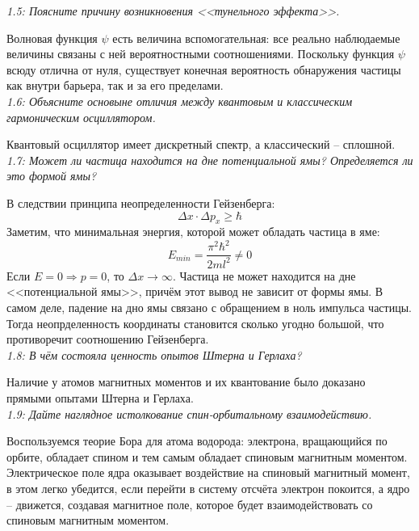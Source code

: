     \emph{1.5: Поясните причину возникновения <<тунельного эффекта>>.}

        Волновая функция \( \psi \) есть величина вспомогательная: 
        все реально наблюдаемые величины связаны с ней вероятностными
        соотношениями. Поскольку функция \( \psi \) всюду отлична от нуля, 
        существует конечная вероятность обнаружения частицы как внутри 
        барьера, так и за его пределами. \\

    \emph{1.6: Объясните основыне отличия между квантовым и классическим 
        гармоническим осциллятором.}
        
        Квантовый осциллятор имеет дискретный спектр, а классический -- 
        сплошной. \\

    \emph{1.7: Может ли частица находится на дне потенциальной ямы? 
    	Определяется ли это формой ямы?}

        В следствии принципа неопределенности Гейзенберга: 
        \[ \Delta x \cdot \Delta p_x \ge \hbar \]
        Заметим, что минимальная энергия, которой может обладать 
        частица в яме:
        \[ E_{min} = \frac{\pi^2\hbar^2}{2ml^2} \neq 0 \]
        Если \( E = 0 \Rightarrow p = 0 \), то 
        \( \Delta x \rightarrow \infty \). Частица не может находится
        на дне <<потенциальной ямы>>, причём этот вывод не зависит 
        от формы ямы. В самом деле, падение на дно ямы связано с 
        обращением в ноль импульса частицы. Тогда неопрделенность 
        координаты становится сколько угодно большой, что противоречит 
        соотношению Гейзенберга. \\
    
    \emph{1.8: В чём состояла ценность опытов Штерна и Герлаха?}

        Наличие у атомов магнитных моментов и их квантование было 
        доказано прямыми опытами Штерна и Герлаха. \\

    \emph{1.9: Дайте наглядное истолкование спин-орбитальному 
    	взаимодействию.}
        
        Воспользуемся теорие Бора для атома водорода: электрона, 
        вращающийся по орбите, обладает спином и тем самым обладает 
        спиновым магнитным моментом. Электрическое поле ядра оказывает 
        воздействие на спиновый магнитный момент, в этом легко 
        убедится, если перейти в систему отсчёта электрон покоится, а 
        ядро -- движется, создавая магнитное поле, которое будет 
        взаимодействовать со спиновым магнитным моментом. \\

